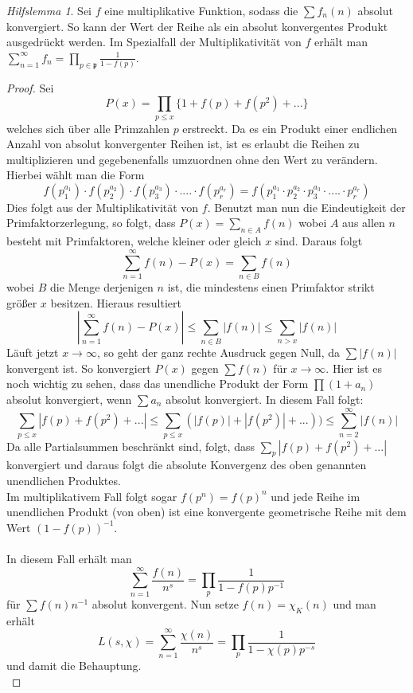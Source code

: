 \documentclass[10pt,a4paper]{article}
\theoremstyle{plain}
\theoremstyle{definition}
\theoremstyle{remark}
\newtheorem{hilfslem}{Hilfslemma}
\begin{document}
 \begin{hilfslem}\label{hilfslemma3}
Sei $f$ eine multiplikative Funktion, sodass die $\sum f_n(n)$ absolut konvergiert. So kann der Wert der Reihe als ein absolut konvergentes Produkt ausgedrückt werden. Im Spezialfall der Multiplikativität von $f$ erhält man $\sum_{n=1}^{\infty}f_n=\prod_{p \in \mathfrak{p}}\frac{1}{1-f(p)}$.

\begin{proof}

Sei $$P(x)= \prod_{p\leq x}\{1+f(p)+f(p^2)+...\}$$welches sich über alle Primzahlen $p$ erstreckt. Da es ein Produkt einer endlichen Anzahl von absolut konvergenter Reihen ist, ist es erlaubt die Reihen zu multiplizieren und gegebenenfalls umzuordnen ohne den Wert zu verändern. Hierbei wählt man die Form
$$f(p_1^{a_1})\cdot f(p_2^{a_2})\cdot f(p_3^{a_3})\cdot....\cdot f(p_{r}^{a_r})=f(p_{1}^{a_1}\cdot p_{2}^{a_2}\cdot p_{3}^{a_3}\cdot ....\cdot p_{r}^{a_r})$$Dies folgt aus der Multiplikativität von $f$. Benutzt man nun die Eindeutigkeit der Primfaktorzerlegung, so folgt, dass $P(x)=\sum_{n \in A}f(n)$ wobei $A$ aus allen $n$ besteht mit Primfaktoren, welche kleiner oder gleich $x$  sind. Daraus folgt $$\sum_{n=1}^{\infty}f(n)-P(x)= \sum_{n \in B}f(n)$$wobei $B$ die Menge derjenigen $n$ ist, die mindestens einen Primfaktor strikt größer $x$ besitzen. Hieraus resultiert$$|\sum_{n=1}^{\infty}f(n)-P(x)|\leq\sum_{n \in B}|f(n)|\leq\sum_{n > x}|f(n)|$$ Läuft jetzt $x\to\infty$, so geht der ganz rechte Ausdruck gegen Null, da $\sum|f(n)|$ konvergent ist. So konvergiert $P(x)$ gegen $\sum f(n)$ für $x \to \infty$. Hier ist es noch wichtig zu sehen, dass das unendliche Produkt der Form $\prod(1+a_n)$ absolut konvergiert, wenn $\sum a_n$ absolut konvergiert. In diesem Fall folgt:$$\sum_{p\leq x}|f(p)+f(p^2)+...| \leq \sum_{p \leq x}(|f(p)|+|f(p^2)|+...))\leq \sum_{n=2}^{\infty}|f(n)|$$Da alle Partialsummen beschränkt sind, folgt, dass $\sum_{p}|f(p)+f(p^2)+...|$ konvergiert und daraus folgt die absolute Konvergenz des oben genannten unendlichen Produktes.
\\
Im multiplikativem Fall folgt sogar $f(p^n)=f(p)^n$ und jede Reihe im unendlichen Produkt (von oben) ist eine konvergente geometrische Reihe mit dem Wert $(1-f(p))^{-1}$.
\\
\\
In diesem Fall  erhält man $$\sum_{n=1}^{\infty}\frac{f(n)}{n^s}=\prod_{p}\frac{1}{1-f(p)p^{-1}}$$ für $\sum f(n)n^{-1}$ absolut konvergent. Nun setze  $f(n)=\chi_K(n)$ und man erhält $$L(s,\chi)=\sum_{n=1}^{\infty}\frac{\chi(n)}{n^s}=\prod_{p}\frac{1}{1-\chi(p)p^{-s}}$$und damit die Behauptung.\\

\end{proof}
\end{hilfslem}
\end{document}
